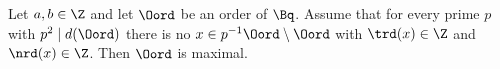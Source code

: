 Let $a,b\in\Z$ and let $\Oord$ be an order of $\Bq$. Assume that for every prime $p$ with $p^2\mid d(\Oord)$ there is no
$x\in p^{-1}\Oord\setminus\Oord$ with $\trd(x)\in\Z$ and $\nrd(x)\in\Z$. Then $\Oord$ is maximal.
